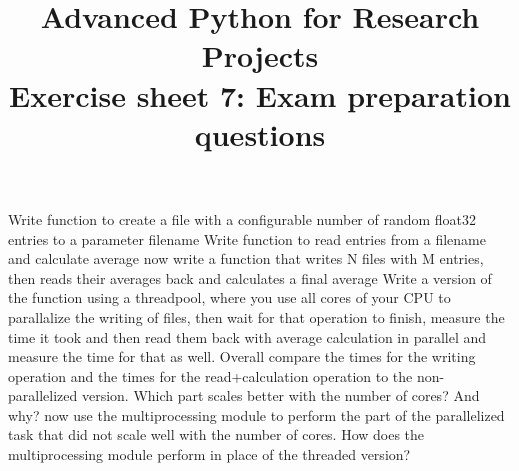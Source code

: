 \documentclass[]{erlangen-problemset}
\title{{\Large Advanced Python for Research Projects} \\[0.3cm] 
Exercise sheet 7: Exam preparation questions}
\begin{document}


\begin{problem}[title={Working with other members}]
\noindent
\Question 
\end{problem}


\begin{problem}[title={Parallelization in python}]
\noindent
\Question Write function to create a file with a configurable number of random float32 entries to a parameter filename
\Question Write function to read entries from a filename and calculate average
\Question now write a function that writes N files with M entries, then reads their averages back and calculates a final average
\Question Write a version of the function using a threadpool, where you use all cores of your CPU to parallalize the writing of files, then wait for that operation to finish, measure the time it took and then read them back with average calculation in parallel and measure the time for that as well. 
Overall compare the times for the writing operation and the times for the read+calculation operation to the non-parallelized version. Which part scales better with the number of cores? And why?
\Question now use the multiprocessing module to perform the part of the parallelized task that did not scale well with the number of cores.
\Question How does the multiprocessing module perform in place of the threaded version?
\end{problem}
\end{document}

